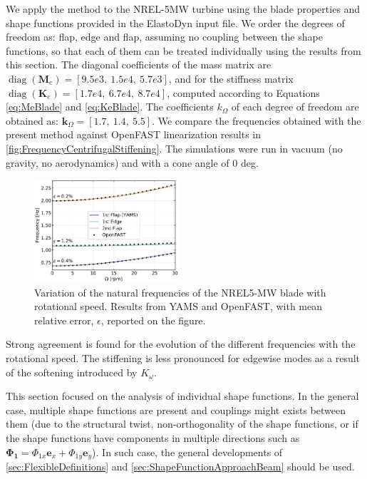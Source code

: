 \documentclass[wes, manuscript]{copernicus}
\renewcommand{\v}[1]{\boldsymbol{#1}}
\newcommand{\m}[1]{\boldsymbol{#1}}
\begin{document}
We apply the method to the NREL-5MW turbine using the blade properties and shape functions provided in the ElastoDyn input file. 
We order the degrees of freedom as:  flap,  edge and  flap, assuming no coupling between the shape functions, so that each of them can be treated individually using the results from this section.
The diagonal coefficients of the mass matrix are $\operatorname{diag}(\m{M}_e) = [9.5e3,\ 1.5e4,\ 5.7e3]$, and for the stiffness matrix
$\operatorname{diag}(\m{K}_e)=[1.7e4,\ 6.7e4,\ 8.7e4]$, computed according to Equations \ref{eq:MeBlade} and \ref{eq:KeBlade}.
The coefficients $k_\Omega$ of each degree of freedom are obtained as: $\v{k}_\Omega =[1.7,\ 1.4,\ 5.5]$. We compare the frequencies obtained with the present method against OpenFAST linearization results in \autoref{fig:FrequencyCentrifugalStiffening}.
The simulations were run in vacuum (no gravity, no aerodynamics) and with a cone angle of 0 deg.
\noindent\begin{figure}[!htb]\centering%
  \includegraphics[width=0.48\textwidth]{figs/FrequencyCentrifugalStiffening.pdf}
  \caption{Variation of the natural frequencies of the NREL5-MW blade with rotational speed. Results from YAMS and OpenFAST, with mean relative error, $\epsilon$, reported on the figure.}\label{fig:FrequencyCentrifugalStiffening}%
\end{figure}
Strong agreement is found for the evolution of the different frequencies with the rotational speed.
The stiffening is less pronounced for edgewise modes as a result of the softening introduced by $K_\omega$.

This section focused on the analysis of individual shape functions.
In the general case, multiple shape functions are present and couplings might exists between them (due to the structural twist, non-orthogonality of the shape functions, or if the shape functions have components in multiple directions such as $\v{\Phi_1}=\Phi_{1x}\v{e}_x+\Phi_{1y}\v{e}_y$).
In such case, the general developments of 
\autoref{sec:FlexibleDefinitions} and 
\autoref{sec:ShapeFunctionApproachBeam} should be used.
\end{document}
